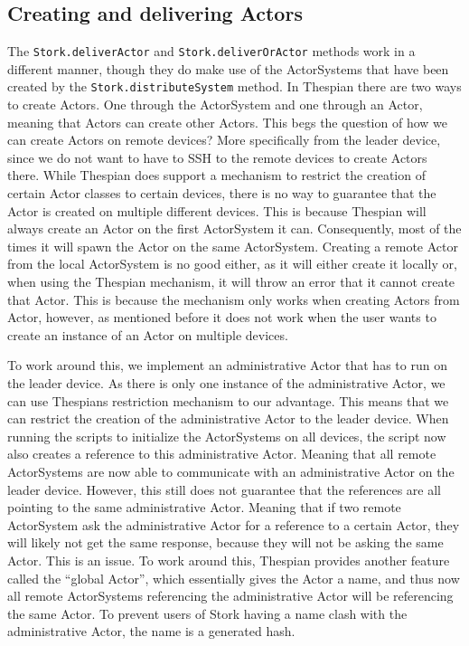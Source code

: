 \documentclass[a4paper]{article}
\begin{document}
\subsection{Creating and delivering Actors}
The \lstinline|Stork.deliverActor| and \lstinline|Stork.deliverOrActor| methods work in a different manner, though they do make use of the ActorSystems that have been created by the \lstinline|Stork.distributeSystem| method. In Thespian there are two ways to create Actors. One through the ActorSystem and one through an Actor, meaning that Actors can create other Actors.
This begs the question of how we can create Actors on remote devices? More specifically from the leader device, since we do not want to have to SSH to the remote devices to create Actors there. While Thespian does support a mechanism to restrict the creation of certain Actor classes to certain devices, there is no way to guarantee that the Actor is created on multiple different devices. This is because Thespian will always create an Actor on the first ActorSystem it can. Consequently, most of the times it will spawn the Actor on the same ActorSystem.
Creating a remote Actor from the local ActorSystem is no good either, as it will either create it locally or, when using the Thespian mechanism, it will throw an error that it cannot create that Actor. This is because the mechanism only works when creating Actors from Actor, however, as mentioned before it does not work when the user wants to create an instance of an Actor on multiple devices.

To work around this, we implement an administrative Actor that has to run on the leader device. As there is only one instance of the administrative Actor, we can use Thespians restriction mechanism to our advantage. This means that we can restrict the creation of the administrative Actor to the leader device. When running the scripts to initialize the ActorSystems on all devices, the script now also creates a reference to this administrative Actor. Meaning that all remote ActorSystems are now able to communicate with an administrative Actor on the leader device. However, this still does not guarantee that the references are all pointing to the same administrative Actor. Meaning that if two remote ActorSystem ask the administrative Actor for a reference to a certain Actor, they will likely not get the same response, because they will not be asking the same Actor. This is an issue. To work around this, Thespian provides another feature called the \enquote{global Actor}, which essentially gives the Actor a name, and thus now all remote ActorSystems referencing the administrative Actor will be referencing the same Actor. To prevent users of Stork having a name clash with the administrative Actor, the name is a generated hash.
\end{document}
